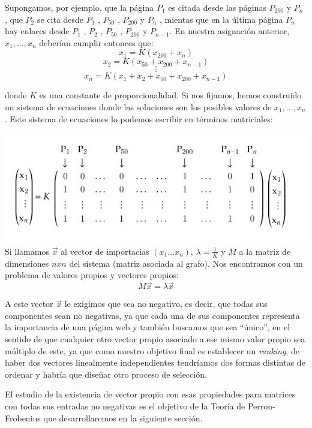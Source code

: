 \documentclass[size=a4, parskip=half, titlepage=false, toc=flat, toc=bib, 12pt]{scrartcl}
\theoremstyle{theorem-style}
\theoremstyle{definition-style}
\theoremstyle{remark-style}
\theoremstyle{example-style}
\theoremstyle{definition-style}
\theoremstyle{remark-style}
\begin{document}
Supongamos, por ejemplo, que la página $P_1$ es citada desde las páginas $P_{200}$ y $P_{n}$ ,
 que $P_2$ se cita desde $P_1$ , $P_{50}$ , $P_{200}$ y $P_n$ , mientas que en la última página $P_n$ hay enlaces desde $P_1$ , $P_2$ , $P_{50}$ , $P_{200}$ y $P_{n-1}$. En nuestra asignación anterior, $x_1, \dots , x_n$ deberían
 cumplir entonces que:
 $$ x_1 = K (x_{200} + x_n) $$
 $$ x_2 = K (x_{50} + x_{200} + x_{n-1}) $$
 $$ \vdots $$
 $$x_n = K (x_1 + x_2 + x_{50} + x_{200} + x_{n-1}) $$

donde $K$ es una constante de proporcionalidad. Si nos fijamos, hemos construido un sistema de ecuaciones
donde las soluciones son los posibles valores de $x_1, \dots , x_n$. Este sistema de ecuaciones
lo podemos escribir en términos matriciales:

\includegraphics[width=1.0\textwidth]{./img/matrizejemplo}
Si llamamos $\vec{x}$ al vector de importacias $(x_1 \dots x_n)$, $\lambda = \frac{1}{K}$ y
$M$ a la matriz de dimensiones $n x n$ del sistema (matriz asociada al grafo). Nos encontramos
con un problema de valores propios y vectores propios:
$$M \vec{x} = \lambda \vec{x} $$

A este vector $\vec{x}$ le exigimos que sea no negativo, es decir, que todas sus componentes sean no negativas, ya que cada una de sus componentes representa la importancia de una página web y también buscamos que sea ``único'', en el sentido de que cualquier otro vector propio asociado a ese mismo valor propio sea múltiplo de este, ya que como nuestro objetivo final es establecer un \textit{ranking}, de haber dos vectores linealmente independientes tendríamos dos formas distintas de ordenar y habría que diseñar otro proceso de selección.

El estudio de la existencia de vector propio con esas propiedades para matrices con todas sus entradas no negativas es el objetivo de la Teoría de Perron-Frobenius que desarrollaremos en la siguiente sección.

\newpage
\end{document}
